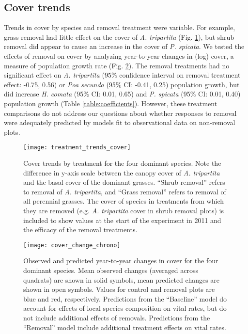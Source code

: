 \documentclass[11pt]{article}
\begin{document}
\begin{doublespacing}
\subsection*{Cover trends}

Trends in cover by species and removal treatment were variable. For example, grass removal had little effect on the cover of \textit{A. tripartita} 
(Fig. \ref{fig:CoverTrends}), but shrub removal did appear to cause an increase in the cover of \textit{P. spicata}. 
We tested the effects of removal on cover by analyzing year-to-year changes in (log) cover, a measure of population growth rate (Fig. \ref{fig:CoverChange}). The removal treatments had no significant effect on 
\textit{A. tripartita} (95\% confidence interval on removal treatment effect: -0.75, 0.56) or 
\textit{Poa secunda} (95\% CI: -0.41, 0.25) population growth, but did increase 
\textit{H. comata} (95\% CI: 0.01, 0.65) and
 \textit{P. spicata} (95\% CI: 0.01, 0.40) population growth 
(Table \ref{table:coefficients}). However, these treatment comparisons do not address our questions about whether responses to removal were 
adequately predicted by models fit to observational data on non-removal plots. 

\begin{figure}[tbp]
\centering
\texttt{[image: treatment\_trends\_cover]}
\caption{Cover trends by treatment for the four dominant species.  Note the difference in y-axis scale between the canopy cover of \textit{A. tripartita} and the basal cover of the dominant grasses. ``Shrub removal'' refers to removal of \textit{A. tripartita}, and ``Grass removal'' refers to removal of all perennial grasses. The cover of species in treatments from which they are removed (e.g. \textit{A. tripartita} cover in shrub removal plots) is included to show values at the start of the experiment in 2011 and the efficacy of the removal treatments.}
\label{fig:CoverTrends}
\end{figure}


\begin{figure}[tbp]
\centering
\texttt{[image: cover\_change\_chrono]}
\caption{Observed and predicted year-to-year changes in cover for the four dominant species. Mean observed changes (averaged across quadrats) are shown in solid symbols, mean predicted changes are shown in open symbols. Values for control and removal plots are blue and red, respectively. Predictions from the ``Baseline'' model do account for effects of local species composition on vital rates, but do not include additional effects of removals. Predictions from the ``Removal'' model include additional treatment effects on vital rates. }
\label{fig:CoverChange}
\end{figure}


\end{doublespacing}
\end{document}
